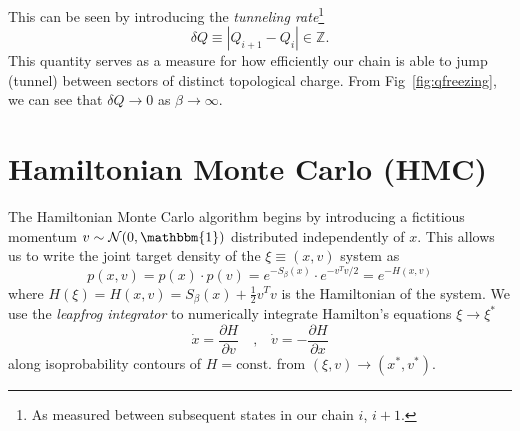 \documentclass[a4paper,11pt]{article}
\begin{document}
This can be seen by introducing the \emph{tunneling rate}\footnote{As measured
between subsequent states in our chain \(i\), \(i+1\).}
%
\begin{equation}
    \delta Q \equiv \left|Q_{i+1} - Q_{i}\right| \in \mathbb{Z}.
\end{equation}
%
This quantity serves as a measure for how efficiently our chain is able to jump
(tunnel) between sectors of distinct topological charge.
%
From Fig~\ref{fig:qfreezing}, we can see that \(\delta Q\rightarrow 0\) as
\(\beta\rightarrow \infty\).
%
\section{\label{sec:hmc}Hamiltonian Monte Carlo (HMC)}
%
%
The Hamiltonian Monte Carlo algorithm begins by introducing a fictitious
momentum \(v \sim \mathcal{N} (0, \mathbbm{1})\) distributed independently of
\(x\).
%
This allows us to write the joint target density of the \(\xi \equiv (x, v)\)
system as
%
\begin{equation}
    p(x, v) = p(x) \cdot p(v) = e^{-S_{\beta}(x)}\cdot e^{-v^{T} v / 2} = e^{-H(x, v)}
\end{equation}
%
where \(H(\xi) = H(x, v) = S_{\beta}(x) + \frac{1}{2} v^{T} v\) is the
Hamiltonian of the system.
%
We use the \emph{leapfrog integrator} to numerically integrate Hamilton's
equations \(\xi \rightarrow \xi^{\ast}\)
%
\begin{equation}
    \dot{x} = \frac{\partial H}{\partial v}\quad \text{,} \quad \dot{v} = - \frac{\partial H}{\partial x}
\end{equation}
%
along isoprobability contours of \(H =\text{const.}\) from \((\xi,
v)\rightarrow (x^{\ast}, v^{\ast})\).
%
\end{document}
